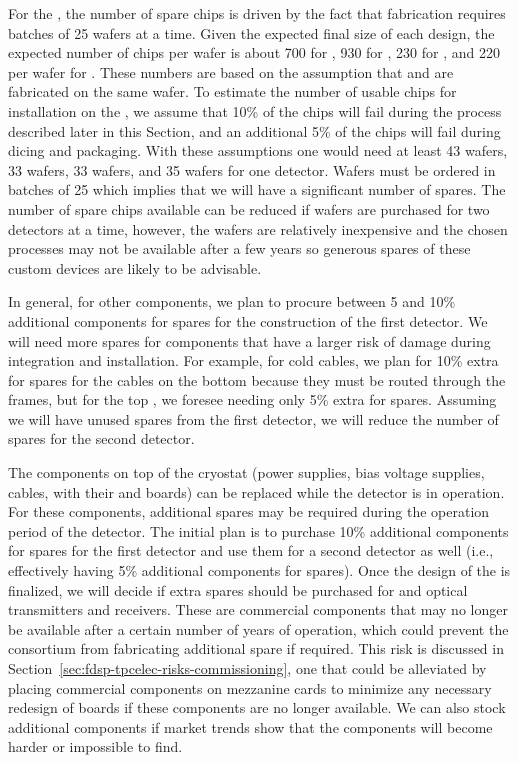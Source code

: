 For the , the number of spare chips is driven by the fact that fabrication
requires batches of 25 wafers at a time. Given the expected final size of each design, the
expected number of chips per wafer is about 700 for , 930 for ,
230 for , and 220 per wafer for . These numbers are based on the
assumption that  and  are fabricated on the same wafer. To
estimate the number of usable chips for installation on the , we assume that
10\% of the chips will fail during the  process described later in this Section,
and an additional 5\% of the chips will fail during dicing and packaging. With these
assumptions one would need at least 43  wafers, 33  wafers,
33  wafers, and 35  wafers for one  detector. Wafers
must be ordered in batches of 25 which implies that we will have a significant number of
spares. The number of spare chips available can be reduced if wafers are purchased for two
 detectors at a time, however, the wafers are relatively inexpensive and the chosen
processes may not be available after a few years so generous spares of these custom devices
are likely to be advisable. 

In general, for other components, we plan to procure between 5 and
10\% additional components for spares for the construction of the first 
detector. We will need more spares for components that have
a larger risk of damage during integration and 
installation. For example, for cold cables, we
plan for 10\% extra for spares for the cables on the bottom  because
they must be routed through the  frames, but
for the top , we foresee needing only 5\% extra for spares.
Assuming we will have unused spares from the first detector, we will reduce the number of
spares for the second  detector.

The components on top of the cryostat (power supplies, bias
voltage supplies, cables,  with their 
and  boards) can be replaced while the
detector is in operation. For these components, additional spares may be required
during the \dunelifetime operation period of the  detector.
The initial plan is to purchase 10\% additional components for spares for the first
 detector and use them for a second detector as well
(i.e., effectively having 5\% additional components for spares). Once the design of
the  is finalized, we will decide if 
extra spares should be purchased for  and optical
transmitters and receivers. These are commercial components 
that may no longer be available after a certain number of 
years of operation, which could prevent the  consortium from
fabricating additional spare  if required. This
risk is discussed in Section~\ref{sec:fdsp-tpcelec-risks-commissioning}, one that
could be alleviated by placing commercial components
on mezzanine cards to minimize any necessary redesign of
boards if these components are no longer available.
We can also stock additional components
if market trends show that the components will  
become harder or impossible to find.

